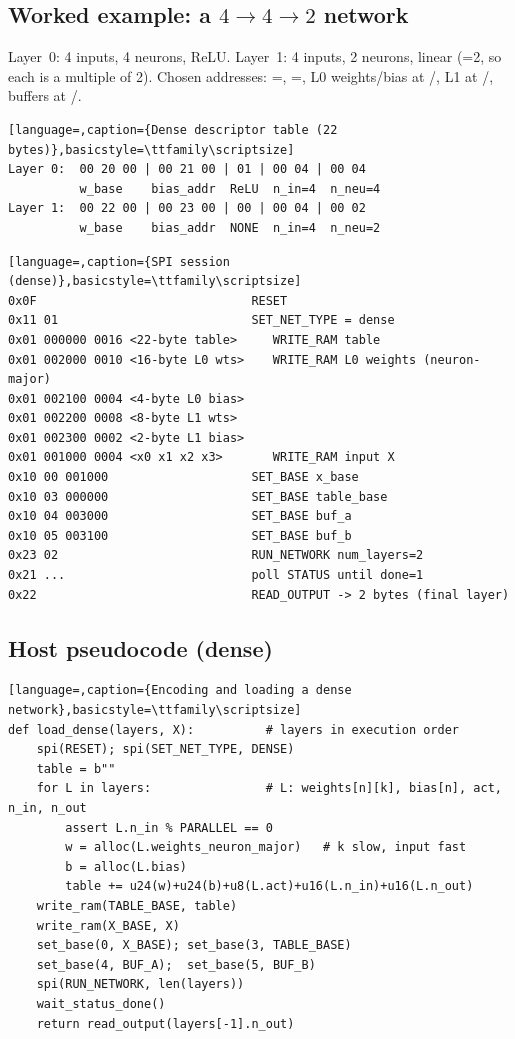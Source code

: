 \subsection{Worked example: a $4\to4\to2$ network}
Layer~0: 4 inputs, 4 neurons, ReLU. Layer~1: 4 inputs, 2 neurons, linear
(=2, so each  is a multiple of 2). Chosen addresses:
=, =, L0 weights/bias at
/, L1 at /, buffers at
/.

\begin{lstlisting}[language=,caption={Dense descriptor table (22 bytes)},basicstyle=\ttfamily\scriptsize]
Layer 0:  00 20 00 | 00 21 00 | 01 | 00 04 | 00 04
          w_base    bias_addr  ReLU  n_in=4  n_neu=4
Layer 1:  00 22 00 | 00 23 00 | 00 | 00 04 | 00 02
          w_base    bias_addr  NONE  n_in=4  n_neu=2
\end{lstlisting}

\begin{lstlisting}[language=,caption={SPI session (dense)},basicstyle=\ttfamily\scriptsize]
0x0F                              RESET
0x11 01                           SET_NET_TYPE = dense
0x01 000000 0016 <22-byte table>     WRITE_RAM table
0x01 002000 0010 <16-byte L0 wts>    WRITE_RAM L0 weights (neuron-major)
0x01 002100 0004 <4-byte L0 bias>
0x01 002200 0008 <8-byte L1 wts>
0x01 002300 0002 <2-byte L1 bias>
0x01 001000 0004 <x0 x1 x2 x3>       WRITE_RAM input X
0x10 00 001000                    SET_BASE x_base
0x10 03 000000                    SET_BASE table_base
0x10 04 003000                    SET_BASE buf_a
0x10 05 003100                    SET_BASE buf_b
0x23 02                           RUN_NETWORK num_layers=2
0x21 ...                          poll STATUS until done=1
0x22                              READ_OUTPUT -> 2 bytes (final layer)
\end{lstlisting}

\subsection{Host pseudocode (dense)}
\begin{lstlisting}[language=,caption={Encoding and loading a dense network},basicstyle=\ttfamily\scriptsize]
def load_dense(layers, X):          # layers in execution order
    spi(RESET); spi(SET_NET_TYPE, DENSE)
    table = b""
    for L in layers:                # L: weights[n][k], bias[n], act, n_in, n_out
        assert L.n_in % PARALLEL == 0
        w = alloc(L.weights_neuron_major)   # k slow, input fast
        b = alloc(L.bias)
        table += u24(w)+u24(b)+u8(L.act)+u16(L.n_in)+u16(L.n_out)
    write_ram(TABLE_BASE, table)
    write_ram(X_BASE, X)
    set_base(0, X_BASE); set_base(3, TABLE_BASE)
    set_base(4, BUF_A);  set_base(5, BUF_B)
    spi(RUN_NETWORK, len(layers))
    wait_status_done()
    return read_output(layers[-1].n_out)
\end{lstlisting}

